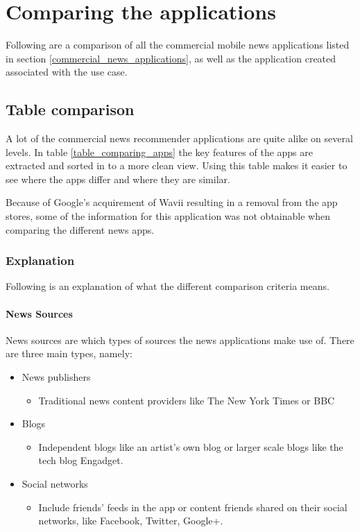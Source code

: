 \chapter{Comparing the applications}
\label{chapter_comparing_applications}
Following are a comparison of all the commercial mobile news applications listed in section \ref{commercial_news_applications}, as well as the application created associated with the use case.


\section{Table comparison}
A lot of the commercial news recommender applications are quite alike on several levels. In table \ref{table_comparing_apps} the key features of the apps are extracted and sorted in to a more clean view. Using this table makes it easier to see where the apps differ and where they are similar. 

Because of Google's acquirement of Wavii resulting in a removal from the app stores, some of the information for this application was not obtainable when comparing the different news apps.

\subsection{Explanation}
Following is an explanation of what the different comparison criteria means.

\subsubsection{News Sources}
News sources are which types of sources the news applications make use of. There are three main types, namely:

\begin{itemize}
	\item News publishers
	\begin{itemize}
		\item Traditional news content providers like The New York Times or BBC
	\end{itemize}

	\item Blogs
	\begin{itemize}
		\item Independent blogs like an artist's own blog or larger scale blogs like the tech blog Engadget.
	\end{itemize}

	\item Social networks
	\begin{itemize}
		\item Include friends' feeds in the app or content friends shared on their social networks, like Facebook, Twitter, Google+.
	\end{itemize}
\end{itemize}

